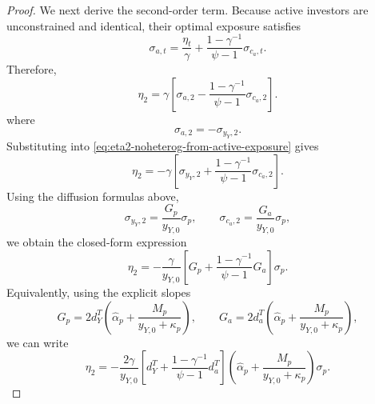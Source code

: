 \begin{proof}
We next derive the second-order term.
Because active investors are unconstrained and identical, their optimal exposure satisfies
\begin{equation}
    \sigma_{a,t}
    =\frac{\eta_t}{\gamma}
    +\frac{1-\gamma^{-1}}{\psi-1}\sigma_{c_a,t}.
\end{equation}
Therefore,
\begin{equation}\label{eq:eta2-noheterog-from-active-exposure}
    \eta_2
    =\gamma\left[
        \sigma_{a,2}
        -\frac{1-\gamma^{-1}}{\psi-1}\sigma_{c_a,2}
    \right].
\end{equation}
where
\begin{equation}
    \sigma_{a,2}=-\sigma_{y_Y,2}.
\end{equation}
Substituting into \eqref{eq:eta2-noheterog-from-active-exposure} gives
\begin{equation}\label{eq:eta2-noheterog-total}
    \eta_2
    =-\gamma\left[
        \sigma_{y_Y,2}
        +\frac{1-\gamma^{-1}}{\psi-1}\sigma_{c_a,2}
    \right].
\end{equation}
Using the diffusion formulas above,
\begin{equation}
    \sigma_{y_Y,2}=\frac{G_p}{y_{Y,0}}\sigma_p,
    \qquad
    \sigma_{c_a,2}=\frac{G_a}{y_{Y,0}}\sigma_p,
\end{equation}
we obtain the closed-form expression
\begin{equation}\label{eq:eta2-noheterog-closed-form}
    \eta_2
    =-\frac{\gamma}{y_{Y,0}}
    \left[
        G_p+\frac{1-\gamma^{-1}}{\psi-1}G_a
    \right]\sigma_p.
\end{equation}
Equivalently, using the explicit slopes
\begin{equation}
    G_p=2d_Y^T\left(\hat{\alpha}_p+\frac{M_p}{y_{Y,0}+\kappa_p}\right),
    \qquad
    G_a=2d_a^T\left(\hat{\alpha}_p+\frac{M_p}{y_{Y,0}+\kappa_p}\right),
\end{equation}
we can write
\begin{equation}\label{eq:eta2-noheterog-slopes}
    \eta_2
    =-\frac{2\gamma}{y_{Y,0}}
    \left[
        d_Y^T+\frac{1-\gamma^{-1}}{\psi-1}d_a^T
    \right]
    \left(\hat{\alpha}_p+\frac{M_p}{y_{Y,0}+\kappa_p}\right)\sigma_p.
\end{equation}


\end{proof}
